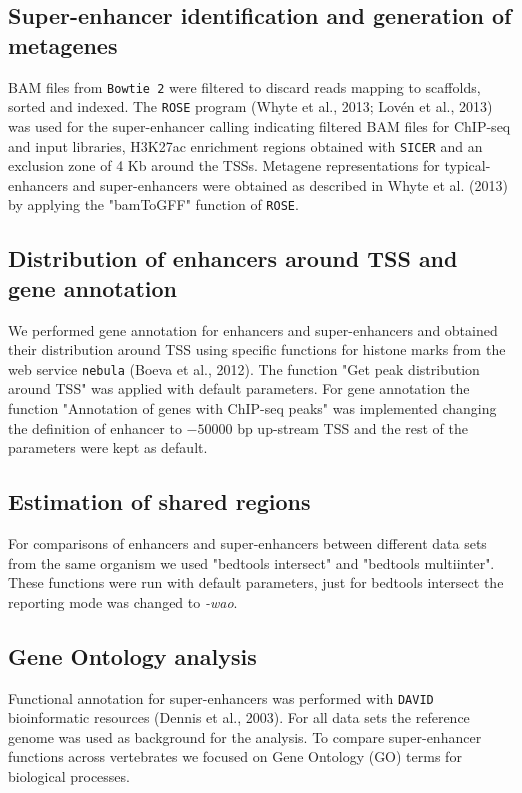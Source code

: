 	\subsection{Super-enhancer identification and generation of metagenes}

		BAM files from \texttt{Bowtie 2} were filtered to discard reads mapping to scaffolds, sorted and indexed. The \texttt{ROSE} program (Whyte et al., 2013; Lov\'en et al., 2013) was used for the super-enhancer calling indicating filtered BAM files for ChIP-seq and input libraries, H3K27ac enrichment regions obtained with \texttt{SICER} and an exclusion zone of 4 Kb around the TSSs. Metagene representations for typical-enhancers and super-enhancers were obtained as described in Whyte et al. (2013) by applying the "bamToGFF" function of \texttt{ROSE}.\\

	\subsection{Distribution of enhancers around TSS and gene annotation}

		We performed gene annotation for enhancers and super-enhancers and obtained their distribution around TSS using specific functions for histone marks from the web service \texttt{nebula} (Boeva et al., 2012). The function "Get peak distribution around TSS" was applied with default parameters. For gene annotation the function "Annotation of genes with ChIP-seq peaks" was implemented changing the definition of enhancer to $-50000$ bp up-stream TSS and the rest of the parameters were kept as default.\\

	\subsection{Estimation of shared regions}

		For comparisons of enhancers and super-enhancers between different data sets from the same organism we used "bedtools intersect" and "bedtools multiinter". These functions were run with default parameters, just for bedtools intersect the reporting mode was changed to \textsl{-wao}.\\

	\subsection{Gene Ontology analysis}

		Functional annotation for super-enhancers was performed with \texttt{DAVID} bioinformatic resources (Dennis et al., 2003). For all data sets the reference genome was used as background for the analysis. To compare super-enhancer functions across vertebrates we focused on Gene Ontology (GO) terms for biological processes.\\

